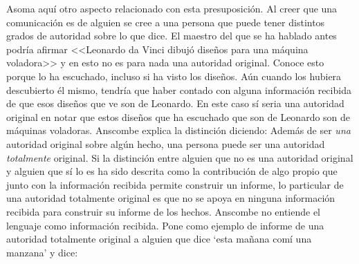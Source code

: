 Asoma aquí otro aspecto relacionado con esta presuposición. Al creer que una
comunicación es de alguien se cree a una persona que puede tener distintos
grados de autoridad sobre lo que dice. El maestro del que se ha hablado antes
podría afirmar <<Leonardo da Vinci dibujó diseños para una máquina voladora>> y
en esto no es para nada una autoridad
original\autocite[Cf.~][6]{anscombe2008faith:tobelieve}. Conoce esto porque lo
ha escuchado, incluso si ha visto los diseños. Aún cuando los hubiera
descubierto él mismo, tendría que haber contado con alguna información recibida
de que esos diseños que ve son de Leonardo. En este caso sí seria una autoridad
original en notar que estos diseños que ha escuchado que son de Leonardo son de
máquinas voladoras. Anscombe explica la distinción diciendo:
 Además de ser
\emph{una} autoridad original sobre algún hecho, una persona puede ser una
autoridad \emph{totalmente} original. Si la distinción entre alguien que no es
una autoridad original y alguien que sí lo es ha sido descrita como la
contribución de algo propio que junto con la información recibida permite
construir un informe, lo particular de una autoridad totalmente original es que
no se apoya en ninguna información recibida para construir su informe de los
hechos. Anscombe no entiende el lenguaje como información recibida. Pone como
ejemplo de informe de una autoridad totalmente original a alguien que dice `esta
mañana comí una manzana' y dice: 

